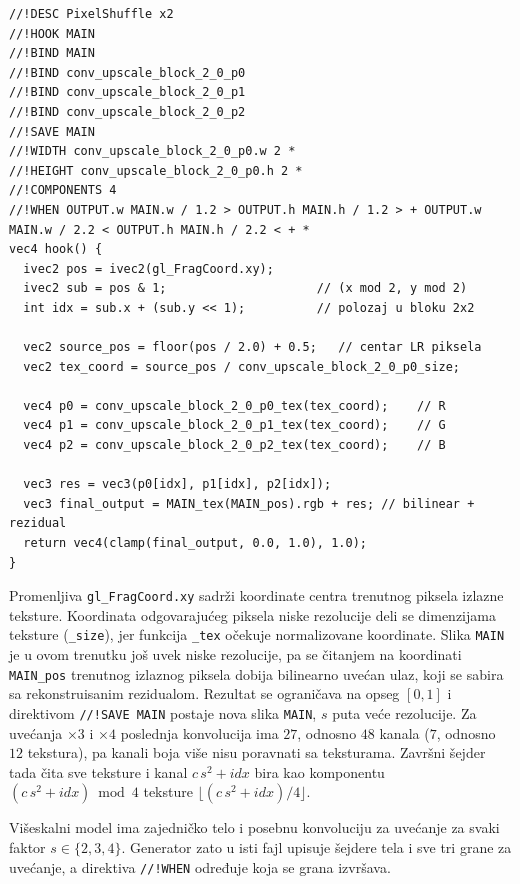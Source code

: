 \documentclass[12pt,a4paper]{article}
\begin{document}
\begin{verbatim}
//!DESC PixelShuffle x2
//!HOOK MAIN
//!BIND MAIN
//!BIND conv_upscale_block_2_0_p0
//!BIND conv_upscale_block_2_0_p1
//!BIND conv_upscale_block_2_0_p2
//!SAVE MAIN
//!WIDTH conv_upscale_block_2_0_p0.w 2 *
//!HEIGHT conv_upscale_block_2_0_p0.h 2 *
//!COMPONENTS 4
//!WHEN OUTPUT.w MAIN.w / 1.2 > OUTPUT.h MAIN.h / 1.2 > + OUTPUT.w MAIN.w / 2.2 < OUTPUT.h MAIN.h / 2.2 < + *
vec4 hook() {
  ivec2 pos = ivec2(gl_FragCoord.xy);
  ivec2 sub = pos & 1;                     // (x mod 2, y mod 2)
  int idx = sub.x + (sub.y << 1);          // polozaj u bloku 2x2

  vec2 source_pos = floor(pos / 2.0) + 0.5;   // centar LR piksela
  vec2 tex_coord = source_pos / conv_upscale_block_2_0_p0_size;

  vec4 p0 = conv_upscale_block_2_0_p0_tex(tex_coord);    // R
  vec4 p1 = conv_upscale_block_2_0_p1_tex(tex_coord);    // G
  vec4 p2 = conv_upscale_block_2_0_p2_tex(tex_coord);    // B

  vec3 res = vec3(p0[idx], p1[idx], p2[idx]);
  vec3 final_output = MAIN_tex(MAIN_pos).rgb + res; // bilinear + rezidual
  return vec4(clamp(final_output, 0.0, 1.0), 1.0);
}
\end{verbatim}

Promenljiva \texttt{gl\_FragCoord.xy} sadrži koordinate centra trenutnog piksela izlazne teksture. Koordinata odgovarajućeg piksela niske rezolucije deli se dimenzijama teksture (\texttt{\_size}), jer funkcija \texttt{\_tex} očekuje normalizovane koordinate. Slika \texttt{MAIN} je u ovom trenutku još uvek niske rezolucije, pa se čitanjem na koordinati \texttt{MAIN\_pos} trenutnog izlaznog piksela dobija bilinearno uvećan ulaz, koji se sabira sa rekonstruisanim rezidualom. Rezultat se ograničava na opseg $[0,1]$ i direktivom \texttt{//!SAVE MAIN} postaje nova slika \texttt{MAIN}, $s$ puta veće rezolucije. Za uvećanja $\times3$ i $\times4$ poslednja konvolucija ima $27$, odnosno $48$ kanala ($7$, odnosno $12$ tekstura), pa kanali boja više nisu poravnati sa teksturama. Završni šejder tada čita sve teksture i kanal $c\,s^2+\mathit{idx}$ bira kao komponentu $(c\,s^2+\mathit{idx}) \bmod 4$ teksture $\lfloor (c\,s^2+\mathit{idx})/4 \rfloor$.

Višeskalni model ima zajedničko telo i posebnu konvoluciju za uvećanje za svaki faktor $s\in\{2,3,4\}$. Generator zato u isti fajl upisuje šejdere tela i sve tri grane za uvećanje, a direktiva \texttt{//!WHEN} određuje koja se grana izvršava.
\end{document}
